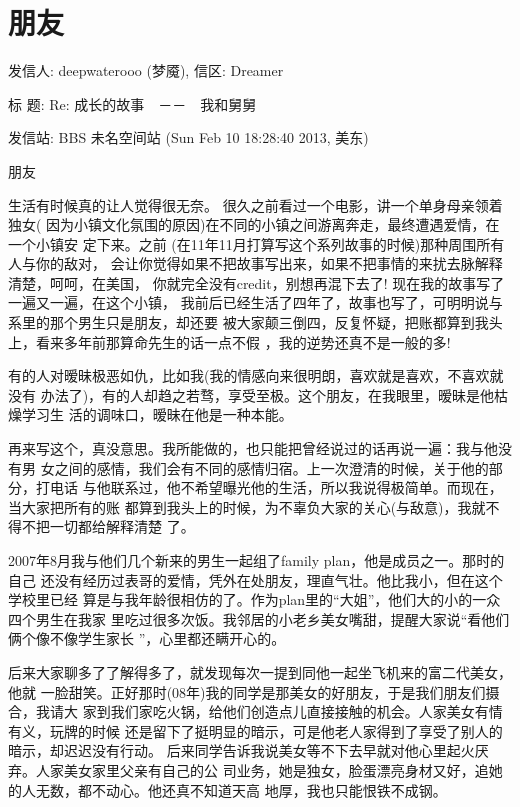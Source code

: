 \documentclass[12pt]{book}
\begin{document}
\section{朋友}
\label{sec-12-2}

发信人: deepwaterooo (梦魇), 信区: Dreamer

标  题: Re: 成长的故事　－－　我和舅舅

发信站: BBS 未名空间站 (Sun Feb 10 18:28:40 2013, 美东)

朋友 

生活有时候真的让人觉得很无奈。 很久之前看过一个电影，讲一个单身母亲领着独女(
因为小镇文化氛围的原因)在不同的小镇之间游离奔走，最终遭遇爱情，在一个小镇安
定下来。之前 (在11年11月打算写这个系列故事的时候)那种周围所有人与你的敌对，
会让你觉得如果不把故事写出来，如果不把事情的来扰去脉解释清楚，呵呵，在美国，
你就完全没有credit，别想再混下去了! 现在我的故事写了一遍又一遍，在这个小镇，
我前后已经生活了四年了，故事也写了，可明明说与系里的那个男生只是朋友，却还要
被大家颠三倒四，反复怀疑，把账都算到我头上，看来多年前那算命先生的话一点不假
，我的逆势还真不是一般的多!

有的人对暧昧极恶如仇，比如我(我的情感向来很明朗，喜欢就是喜欢，不喜欢就没有
办法了)，有的人却趋之若骛，享受至极。这个朋友，在我眼里，暧昧是他枯燥学习生
活的调味口，暧昧在他是一种本能。

再来写这个，真没意思。我所能做的，也只能把曾经说过的话再说一遍：我与他没有男
女之间的感情，我们会有不同的感情归宿。上一次澄清的时候，关于他的部分，打电话
与他联系过，他不希望曝光他的生活，所以我说得极简单。而现在，当大家把所有的账
都算到我头上的时候，为不辜负大家的关心(与敌意)，我就不得不把一切都给解释清楚
了。

2007年8月我与他们几个新来的男生一起组了family plan，他是成员之一。那时的自己
还没有经历过表哥的爱情，凭外在处朋友，理直气壮。他比我小，但在这个学校里已经
算是与我年龄很相仿的了。作为plan里的“大姐”，他们大的小的一众四个男生在我家
里吃过很多次饭。我邻居的小老乡美女嘴甜，提醒大家说“看他们俩个像不像学生家长
”，心里都还瞒开心的。

后来大家聊多了了解得多了，就发现每次一提到同他一起坐飞机来的富二代美女，他就
一脸甜笑。正好那时(08年)我的同学是那美女的好朋友，于是我们朋友们摄合，我请大
家到我们家吃火锅，给他们创造点儿直接接触的机会。人家美女有情有义，玩牌的时候
还是留下了挺明显的暗示，可是他老人家得到了享受了别人的暗示，却迟迟没有行动。
后来同学告诉我说美女等不下去早就对他心里起火厌弃。人家美女家里父亲有自己的公
司业务，她是独女，脸蛋漂亮身材又好，追她的人无数，都不动心。他还真不知道天高
地厚，我也只能恨铁不成钢。
\end{document}
